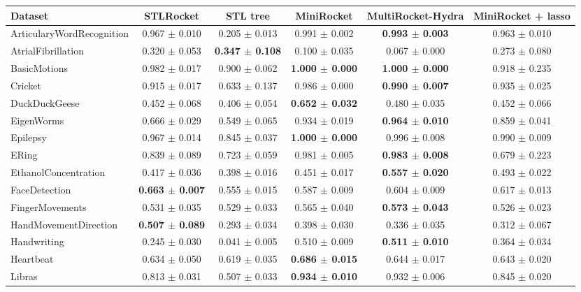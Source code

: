 \begin{tabular}{lccccc}
\toprule
Dataset & STLRocket & STL tree & MiniRocket & MultiRocket-Hydra & MiniRocket + lasso \\
\midrule
ArticularyWordRecognition & 0.967 $\pm$ 0.010 & 0.205 $\pm$ 0.013 & 0.991 $\pm$ 0.002 & \textbf{0.993 $\pm$ 0.003} & 0.963 $\pm$ 0.010 \\
AtrialFibrillation & 0.320 $\pm$ 0.053 & \textbf{0.347 $\pm$ 0.108} & 0.100 $\pm$ 0.035 & 0.067 $\pm$ 0.000 & 0.273 $\pm$ 0.080 \\
BasicMotions & 0.982 $\pm$ 0.017 & 0.900 $\pm$ 0.062 & \textbf{1.000 $\pm$ 0.000} & \textbf{1.000 $\pm$ 0.000} & 0.918 $\pm$ 0.235 \\
Cricket & 0.915 $\pm$ 0.017 & 0.633 $\pm$ 0.137 & 0.986 $\pm$ 0.000 & \textbf{0.990 $\pm$ 0.007} & 0.935 $\pm$ 0.025 \\
DuckDuckGeese & 0.452 $\pm$ 0.068 & 0.406 $\pm$ 0.054 & \textbf{0.652 $\pm$ 0.032} & 0.480 $\pm$ 0.035 & 0.452 $\pm$ 0.066 \\
EigenWorms & 0.666 $\pm$ 0.029 & 0.549 $\pm$ 0.065 & 0.934 $\pm$ 0.019 & \textbf{0.964 $\pm$ 0.010} & 0.859 $\pm$ 0.041 \\
Epilepsy & 0.967 $\pm$ 0.014 & 0.845 $\pm$ 0.037 & \textbf{1.000 $\pm$ 0.000} & 0.996 $\pm$ 0.008 & 0.990 $\pm$ 0.009 \\
ERing & 0.839 $\pm$ 0.089 & 0.723 $\pm$ 0.059 & 0.981 $\pm$ 0.005 & \textbf{0.983 $\pm$ 0.008} & 0.679 $\pm$ 0.223 \\
EthanolConcentration & 0.417 $\pm$ 0.036 & 0.398 $\pm$ 0.016 & 0.451 $\pm$ 0.017 & \textbf{0.557 $\pm$ 0.020} & 0.493 $\pm$ 0.022 \\
FaceDetection & \textbf{0.663 $\pm$ 0.007} & 0.555 $\pm$ 0.015 & 0.587 $\pm$ 0.009 & 0.604 $\pm$ 0.009 & 0.617 $\pm$ 0.013 \\
FingerMovements & 0.531 $\pm$ 0.035 & 0.529 $\pm$ 0.033 & 0.565 $\pm$ 0.040 & \textbf{0.573 $\pm$ 0.043} & 0.526 $\pm$ 0.023 \\
HandMovementDirection & \textbf{0.507 $\pm$ 0.089} & 0.293 $\pm$ 0.034 & 0.398 $\pm$ 0.030 & 0.336 $\pm$ 0.035 & 0.312 $\pm$ 0.067 \\
Handwriting & 0.245 $\pm$ 0.030 & 0.041 $\pm$ 0.005 & 0.510 $\pm$ 0.009 & \textbf{0.511 $\pm$ 0.010} & 0.364 $\pm$ 0.034 \\
Heartbeat & 0.634 $\pm$ 0.050 & 0.619 $\pm$ 0.035 & \textbf{0.686 $\pm$ 0.015} & 0.644 $\pm$ 0.017 & 0.643 $\pm$ 0.020 \\
Libras & 0.813 $\pm$ 0.031 & 0.507 $\pm$ 0.033 & \textbf{0.934 $\pm$ 0.010} & 0.932 $\pm$ 0.006 & 0.845 $\pm$ 0.020 \\

\end{tabular}

